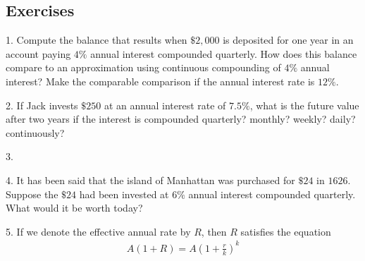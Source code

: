 \documentclass[10pt,]{book}
\theoremstyle{plain}
\theoremstyle{definition}
\theoremstyle{definition}
\theoremstyle{definition}
\numberwithin{equation}{section}
\begin{document}
\subsection[{Exercises}]{Exercises}\label{exercises-8}
\begin{exerciselist}
\item[1.]\hypertarget{exercise-50}{}Compute the balance that results when \(\$2,000\) is deposited for one year in an account paying \(4\%\) annual interest compounded quarterly.  How does this balance compare to an approximation using continuous compounding of \(4\%\) annual interest? Make the comparable comparison if the annual interest rate is \(12\%\).%
\par\smallskip
\item[2.]\hypertarget{exercise-51}{}If Jack invests \(\$250\) at an annual interest rate of \(7.5\%\), what is the future value after two years if the interest is compounded quarterly? monthly? weekly? daily? continuously?%
\par\smallskip
\item[3.]\hypertarget{exercise-52}{}\leavevmode%
\par\smallskip
\item[4.]\hypertarget{exercise-53}{}It has been said that the island of Manhattan was purchased for \(\$24\) in \(1626\).  Suppose the \(\$24\) had been invested at \(6\%\) annual interest compounded quarterly.  What would it be worth today?%
\par\smallskip
\item[5.]\hypertarget{exercise-54}{}If we denote the effective annual rate by \(R\), then \(R\) satisfies the equation%
%
\begin{gather*}
A(1 + R) = A (1 + \frac{r}{k})^k

\end{gather*}
\end{exerciselist}
\end{document}
